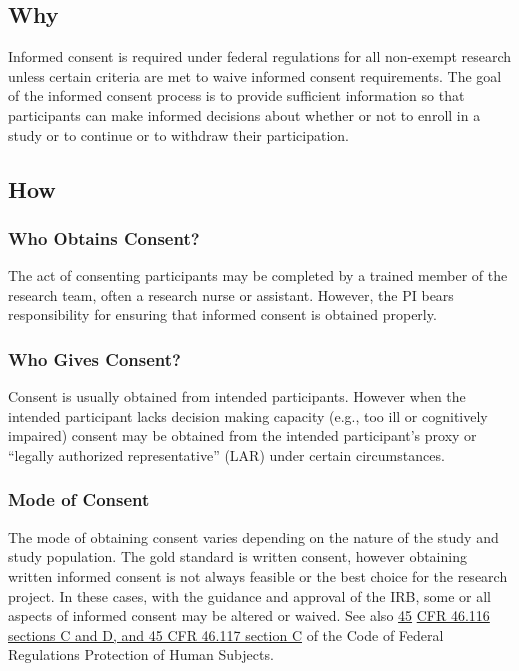 \documentclass[]{book}
\begin{document}
\subsection{Why}\label{why-10}

Informed consent is required under federal regulations for all
non-exempt research unless certain criteria are met to waive informed
consent requirements. The goal of the informed consent process is to
provide sufficient information so that participants can make informed
decisions about whether or not to enroll in a study or to continue or to
withdraw their participation.

\subsection{How}\label{how-10}

\subsubsection{Who Obtains Consent?}\label{who-obtains-consent}

The act of consenting participants may be completed by a trained member
of the research team, often a research nurse or assistant. However, the
PI bears responsibility for ensuring that informed consent is obtained
properly.

\subsubsection{Who Gives Consent?}\label{who-gives-consent}

Consent is usually obtained from intended participants. However when the
intended participant lacks decision making capacity (e.g., too ill or
cognitively impaired) consent may be obtained from the intended
participant's proxy or ``legally authorized representative'' (LAR) under
certain circumstances.

\subsubsection{Mode of Consent}\label{mode-of-consent}

The mode of obtaining consent varies depending on the nature of the
study and study population. The gold standard is written consent,
however obtaining written informed consent is not always feasible or the
best choice for the research project. In these cases, with the guidance
and approval of the IRB, some or all aspects of informed consent may be
altered or waived. See also
\href{http://www.hhs.gov/ohrp/regulations-and-policy/regulations/45-cfr-46/index.html}{45}
\href{http://www.hhs.gov/ohrp/regulations-and-policy/regulations/45-cfr-46/index.html}{CFR
46.116 sections C and D, and 45 CFR 46.117 section C} of the Code of
Federal Regulations Protection of Human Subjects.
\end{document}
